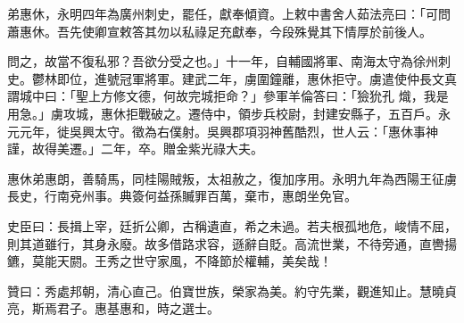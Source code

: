 \begin{pinyinscope}
 弟惠休，永明四年為廣州刺史，罷任，獻奉傾資。上敕中書舍人茹法亮曰：「可問蕭惠休。吾先使卿宣敕答其勿以私祿足充獻奉，今段殊覺其下情厚於前後人。



 問之，故當不復私邪？吾欲分受之也。」十一年，自輔國將軍、南海太守為徐州刺史。鬱林即位，進號冠軍將軍。建武二年，虜圍鐘離，惠休拒守。虜遣使仲長文真謂城中曰：「聖上方修文德，何故完城拒命？」參軍羊倫答曰：「獫狁孔
 熾，我是用急。」虜攻城，惠休拒戰破之。遷侍中，領步兵校尉，封建安縣子，五百戶。永元元年，徙吳興太守。徵為右僕射。吳興郡項羽神舊酷烈，世人云：「惠休事神謹，故得美遷。」二年，卒。贈金紫光祿大夫。



 惠休弟惠朗，善騎馬，同桂陽賊叛，太祖赦之，復加序用。永明九年為西陽王征虜長史，行南兗州事。典簽何益孫贓罪百萬，棄市，惠朗坐免官。



 史臣曰：長揖上宰，廷折公卿，古稱遺直，希之未過。若夫根孤地危，峻情不屈，則其道雖行，其身永廢。故多借路求容，遜辭自貶。高流世業，不待旁通，直轡揚鑣，莫能天閼。王秀之世守家風，不降節於權輔，美矣哉！



 贊曰：秀處邦朝，清心直己。伯寶世族，榮家為美。約守先業，觀進知止。慧曉貞亮，斯焉君子。惠基惠和，時之選士。



\end{pinyinscope}